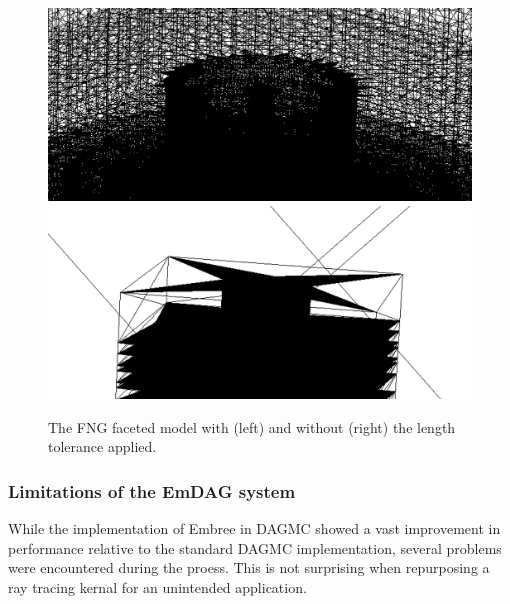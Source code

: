 \documentclass[12pt, a4paper]{article}
\begin{document}
\begin{figure}[H]
  \small
  \begin{center}
    \includegraphics[scale=0.15]{fng_len_tol.png}
    \includegraphics[scale=0.15]{fng_facet_tol.png}
    \caption{The FNG faceted model with (left) and without (right) the length tolerance applied.}
    \label{fng-faceted-models}
  \end{center}

\end{figure}



\subsubsection{Limitations of the EmDAG system}%

While the implementation of Embree in DAGMC showed a vast improvement in performance relative to the standard DAGMC implementation, several problems were encountered during the proess. This is not surprising when repurposing a ray tracing kernal for an unintended application.
\end{document}
